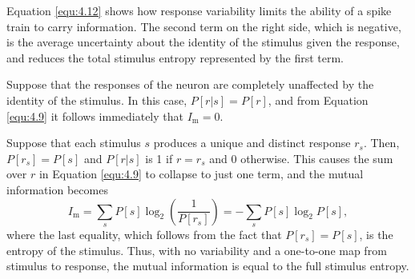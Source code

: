 \begin{rem}
  Equation \ref{equ:4.12} shows how response variability limits the ability of a spike train to carry information. The second term on the right side, which is negative, is the average uncertainty about the identity of the stimulus given the response, and reduces the total stimulus entropy represented by the first term.
\end{rem}

\begin{exm}
  Suppose that the responses of the neuron are completely unaffected by the identity of the stimulus. In this case, $P[r|s] = P[r]$, and from Equation \ref{equ:4.9} it follows immediately that $I_{\text{m}} = 0$.
\end{exm}

\begin{exm}
  Suppose that each stimulus $s$ produces a unique and distinct response $r_s$. Then, $P[r_s]= P[s]$ and $P[r|s]$ is 1 if $r=r_s$ and 0 otherwise. This causes the sum over $r$ in Equation \ref{equ:4.9} to collapse to just one term, and the mutual information becomes
  \begin{equation}
    \label{equ:4.13}
    I_{\text{m}}=\sum\limits_sP[s]\log_2\left( \frac{1}{P[r_s]} \right)=-\sum\limits_{s}{P[s]\log_2P[s]},
  \end{equation}
  where the last equality, which follows from the fact that $P[r_s] = P[s]$, is the entropy of the stimulus. Thus, with no variability and a one-to-one map from stimulus to response, the mutual information is equal to the full stimulus entropy.
\end{exm}
